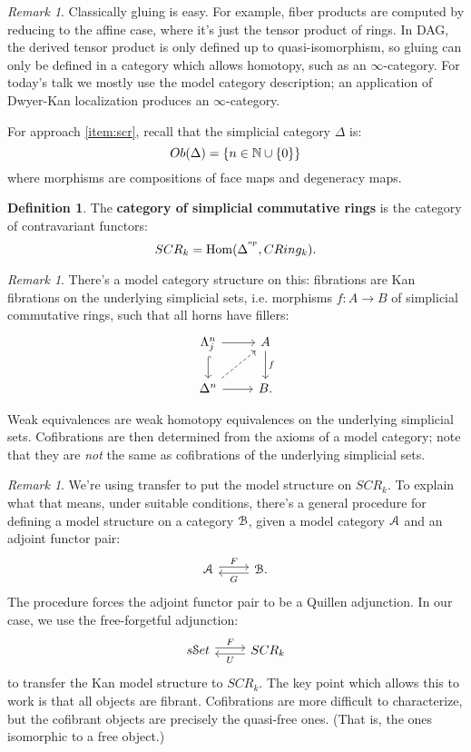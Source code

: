 \documentclass[10pt,a4paper,reqno,oneside]{book} %
\theoremstyle{plain}
\theoremstyle{definition}
\newtheorem{defin}[thm]{Definition}
\theoremstyle{remark}
\newtheorem{rem}[thm]{Remark}
\numberwithin{equation}{section}
\begin{document}
\begin{rem}
Classically gluing is easy. For example, fiber products are computed by reducing to the affine case, where it's just the
tensor product of rings. In DAG, the derived tensor product is only defined up to quasi-isomorphism, so gluing can only be
defined in a category which allows homotopy, such as an $\infty$-category. For today's talk we mostly use the model category description;
an application of Dwyer-Kan localization produces an $\infty$-category.
\end{rem}

For approach \ref{item:scr}, recall that the simplicial category $\Delta$ is:
\[ 	Ob(\Delta) = \{n \in \mathbb N \cup \{0\} \}		\]
where morphisms are compositions of face maps and degeneracy maps. 
\begin{defin}
The \textbf{category of simplicial commutative rings} is the category of contravariant functors:
\[	 SCR_k = \operatorname{Hom}(\Delta^{^\mathrm{op}}, CRing_k).	\] 
\end{defin}

\begin{rem}
There's a model category structure on this: fibrations are Kan fibrations on the underlying simplicial sets, i.e. morphisms
$f: A \to B$ of simplicial commutative rings, such that all horns have fillers:
\[
\begin{tikzcd}
\Lambda^n_j\arrow[hook]{d}\arrow{r} & A\arrow{d}{f} \\
\Delta^n\arrow{r}\arrow[dashed]{ur} & B.
\end{tikzcd}
\]

Weak equivalences
are weak homotopy equivalences on the underlying simplicial sets. Cofibrations are then determined from the axioms of a
model category; note that they are \textit{not} the same as cofibrations of the underlying simplicial sets.
\end{rem}

\begin{rem}
We're using transfer to put the model structure on $SCR_k$. To explain what that means, under suitable conditions, there's 
a general procedure for defining a model structure on a category $\mathcal B$, given a model category $\mathcal A$ and an adjoint functor
pair:
\[
\begin{tikzcd}
 \cA \arrow[shift left]{r}{F} & \cB \arrow[shift left]{l}{G} .
\end{tikzcd}
\]
The procedure forces the adjoint functor pair to be a Quillen adjunction. In our case, we use the free-forgetful adjunction:
\[
\begin{tikzcd}
 s\cS et \arrow[shift left]{r}{F} & SCR_k \arrow[shift left]{l}{U}
\end{tikzcd}
\]
to transfer the Kan model structure to $SCR_k$. The key point which allows this to work is that all objects are fibrant. 
Cofibrations are more difficult to characterize, but the cofibrant objects are precisely the quasi-free ones. (That is,
the ones isomorphic to a free object.)
\end{rem}
\end{document}
